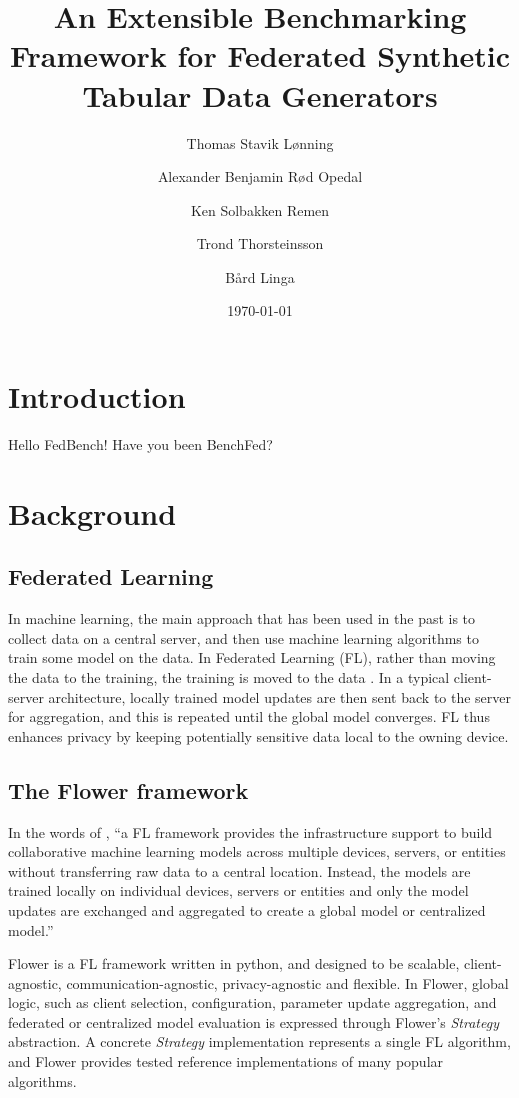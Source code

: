 \documentclass{article}
\title{An Extensible Benchmarking Framework for Federated
Synthetic Tabular Data Generators}
\author{Thomas Stavik Lønning \and Alexander Benjamin Rød Opedal \and Ken Solbakken Remen \and Trond Thorsteinsson \and Bård Linga}
\date{\today}
\begin{document}
\raggedbottom
\maketitle
\tableofcontents
\newpage

\section{Introduction}
Hello FedBench! Have you been BenchFed?

\section{Background}

\subsection{Federated Learning}
In machine learning, the main approach that has been used in the past
is to collect data on a central server, and then use machine learning
algorithms to train some model on the data. In Federated Learning (FL),
rather than moving the data to the training, the training
is moved to the data \parencite{flower_tutorial}.
In a typical client-server architecture, locally trained model updates
are then sent back to the server for aggregation, and this is repeated
until the global model converges. FL thus enhances privacy by keeping
potentially sensitive data local to the owning device.

\subsection{The Flower framework}
In the words of \cite{fed_frameworks}, \enquote{a FL framework provides the
infrastructure support to build collaborative machine learning
models across multiple devices, servers, or entities without
transferring raw data to a central location. Instead, the models
are trained locally on individual devices, servers or entities
and only the model updates are exchanged and aggregated to
create a global model or centralized model.}

Flower \parencite{flower_article} is a FL framework written in python, and designed to be
scalable, client-agnostic, communication-agnostic, privacy-agnostic
and flexible. In Flower, global logic, such
as client selection, configuration, parameter update aggregation,
and federated or centralized model evaluation is expressed through
Flower's \textit{Strategy} abstraction. A concrete \textit{Strategy}
implementation represents a single FL algorithm, and Flower provides
tested reference implementations of many popular algorithms.
\parencite{flower_article}
\end{document}

